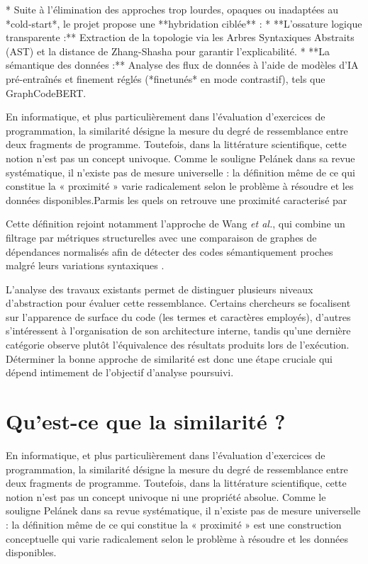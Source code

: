       * Suite à l'élimination des approches trop lourdes, opaques ou inadaptées au *cold-start*, le projet propose une **hybridation ciblée** :
          * **L'ossature logique transparente :** Extraction de la topologie via les Arbres Syntaxiques Abstraits (AST) et la distance de Zhang-Shasha pour garantir l'explicabilité.
          * **La sémantique des données :** Analyse des flux de données à l'aide de modèles d'IA pré-entraînés et finement réglés (*finetunés* en mode contrastif), tels que GraphCodeBERT.




En informatique, et plus particulièrement dans l'évaluation d'exercices de programmation, 
la similarité désigne la mesure du degré de ressemblance entre deux fragments 
de programme. Toutefois, dans la littérature scientifique, cette notion n'est 
pas un concept univoque. Comme le souligne Pelánek \cite{pelanek_2020} dans sa
 revue systématique, il n'existe pas de mesure universelle : la définition même 
 de ce qui constitue la « proximité » varie radicalement selon le problème à 
 résoudre et les données disponibles.Parmis les quels on retrouve une proximité caracterisé par 



Cette définition rejoint notamment l'approche de Wang \emph{et al.}, qui combine un filtrage par métriques structurelles avec une comparaison de graphes de dépendances normalisés afin de détecter des codes sémantiquement proches malgré leurs variations syntaxiques \cite{wang_detection_2014}.



L'analyse des travaux existants permet  de distinguer  plusieurs niveaux d'abstraction pour évaluer cette ressemblance.
  Certains chercheurs se focalisent sur l'apparence de surface du code (les termes et caractères employés),
   d'autres s'intéressent à l'organisation de son architecture interne,
    tandis qu'une dernière catégorie observe plutôt l'équivalence des résultats
     produits lors de l'exécution. Déterminer la bonne approche de similarité est donc 
     une étape cruciale qui dépend intimement de l'objectif d'analyse poursuivi.


\section{Qu'est-ce que la similarité ?}

En informatique, et plus particulièrement dans l'évaluation d'exercices de programmation, la similarité désigne la mesure du degré de ressemblance entre deux fragments de programme. Toutefois, dans la littérature scientifique, cette notion n'est pas un concept univoque ni une propriété absolue. Comme le souligne Pelánek \cite{pelanek_2020} dans sa revue systématique, il n'existe pas de mesure universelle : la définition même de ce qui constitue la « proximité » est une construction conceptuelle qui varie radicalement selon le problème à résoudre et les données disponibles.

